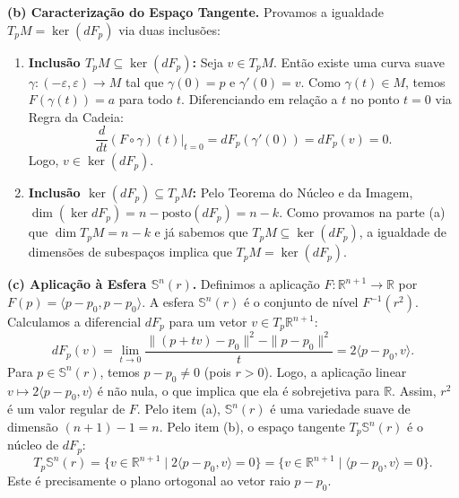 {	\textbf{(b) Caracterização do Espaço Tangente.}
	Provamos a igualdade $T_p M = \ker(dF_p)$ via duas inclusões:
	\begin{enumerate}
		\item \textbf{Inclusão $T_p M \subseteq \ker(dF_p)$:} Seja $v \in T_p M$. Então existe uma curva suave $\gamma : (-\varepsilon, \varepsilon) \to M$ tal que $\gamma(0)=p$ e $\gamma'(0)=v$. Como $\gamma(t) \in M$, temos $F(\gamma(t)) = a$ para todo $t$. Diferenciando em relação a $t$ no ponto $t=0$ via Regra da Cadeia:
		\begin{equation*}
			\frac{d}{dt}(F \circ \gamma)(t) \Big|_{t=0} = dF_p(\gamma'(0)) = dF_p(v) = 0.
		\end{equation*}
		Logo, $v \in \ker(dF_p)$.
		\item \textbf{Inclusão $\ker(dF_p) \subseteq T_p M$:} Pelo Teorema do Núcleo e da Imagem, $\dim(\ker dF_p) = n - \text{posto}(dF_p) = n - k$. Como provamos na parte (a) que $\dim T_p M = n-k$ e já sabemos que $T_p M \subseteq \ker(dF_p)$, a igualdade de dimensões de subespaços implica que $T_p M = \ker(dF_p)$.
	\end{enumerate}
	
	\textbf{(c) Aplicação à Esfera $\mathbb{S}^n(r)$.}
	Definimos a aplicação $F : \mathbb{R}^{n+1} \to \mathbb{R}$ por $F(p) = \langle p - p_0, p - p_0 \rangle$. A esfera $\mathbb{S}^n(r)$ é o conjunto de nível $F^{-1}(r^2)$.
	Calculamos a diferencial $dF_p$ para um vetor $v \in T_p \mathbb{R}^{n+1}$:
	\begin{equation*}
		dF_p(v) = \lim_{t \to 0} \frac{\| (p+tv) - p_0 \|^2 - \|p - p_0\|^2}{t} = 2 \langle p - p_0, v \rangle.
	\end{equation*}
	Para $p \in \mathbb{S}^n(r)$, temos $p - p_0 \neq 0$ (pois $r > 0$). Logo, a aplicação linear $v \mapsto 2 \langle p - p_0, v \rangle$ é não nula, o que implica que ela é sobrejetiva para $\mathbb{R}$. Assim, $r^2$ é um valor regular de $F$.
	Pelo item (a), $\mathbb{S}^n(r)$ é uma variedade suave de dimensão $(n+1) - 1 = n$.
	Pelo item (b), o espaço tangente $T_p \mathbb{S}^n(r)$ é o núcleo de $dF_p$:
	\begin{equation*}
		T_p \mathbb{S}^n(r) = \{ v \in \mathbb{R}^{n+1} \mid 2 \langle p - p_0, v \rangle = 0 \} = \{ v \in \mathbb{R}^{n+1} \mid \langle p - p_0, v \rangle = 0 \}.
	\end{equation*}
	Este é precisamente o plano ortogonal ao vetor raio $p - p_0$.
}


